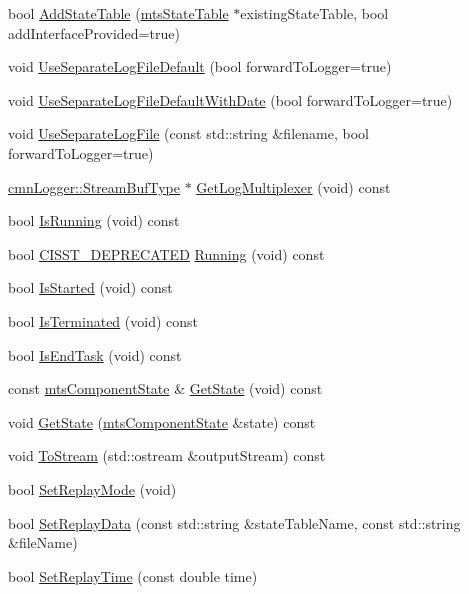 \begin{DoxyCompactItemize}
\item 
bool \hyperlink{classmts_component_a5aac2a946a339738a9475772f71c9e0e}{Add\-State\-Table} (\hyperlink{classmts_state_table}{mts\-State\-Table} $\ast$existing\-State\-Table, bool add\-Interface\-Provided=true)
\item 
void \hyperlink{classmts_component_ab5b591dab8bacf138f972ec61d1f6d8e}{Use\-Separate\-Log\-File\-Default} (bool forward\-To\-Logger=true)
\item 
void \hyperlink{classmts_component_ae3b69d39e570c8465cb105b95ed59c65}{Use\-Separate\-Log\-File\-Default\-With\-Date} (bool forward\-To\-Logger=true)
\item 
void \hyperlink{classmts_component_a0dd9bd8b7fcd7d7e09871d0ace126699}{Use\-Separate\-Log\-File} (const std\-::string \&filename, bool forward\-To\-Logger=true)
\item 
\hyperlink{classcmn_logger_a7d192777882d1dc6bb48ceac0b4e65bb}{cmn\-Logger\-::\-Stream\-Buf\-Type} $\ast$ \hyperlink{classmts_component_a368c7115c8d9533d634077b2d76af18b}{Get\-Log\-Multiplexer} (void) const 
\item 
bool \hyperlink{classmts_component_ac6f03b0bddadb0bf316e4c62726c3928}{Is\-Running} (void) const 
\item 
bool \hyperlink{cmn_portability_8h_a63da7164735f9501be651b1f2bbc0121}{C\-I\-S\-S\-T\-\_\-\-D\-E\-P\-R\-E\-C\-A\-T\-E\-D} \hyperlink{classmts_component_a70c67f9502b7779ca6121a9b31034088}{Running} (void) const 
\item 
bool \hyperlink{classmts_component_a63a779dbed36bae9490a885a66abb14d}{Is\-Started} (void) const 
\item 
bool \hyperlink{classmts_component_afee031d17dd144505bdb2400c20c787f}{Is\-Terminated} (void) const 
\item 
bool \hyperlink{classmts_component_a9ea79bb1ef93b96f9caab0dd382fcd16}{Is\-End\-Task} (void) const 
\item 
const \hyperlink{classmts_component_state}{mts\-Component\-State} \& \hyperlink{classmts_component_accc6e7dd1a32c10a4d3235f261b5fdcc}{Get\-State} (void) const 
\item 
void \hyperlink{classmts_component_a3a1956b97486a0ee89cc86c73004c9ce}{Get\-State} (\hyperlink{classmts_component_state}{mts\-Component\-State} \&state) const 
\item 
void \hyperlink{classmts_component_aa654d2a0e1d1a9298ef2c8e5d69514df}{To\-Stream} (std\-::ostream \&output\-Stream) const 
\item 
bool \hyperlink{classmts_component_a13d754f15ab268dbbbe433780a635c1a}{Set\-Replay\-Mode} (void)
\item 
bool \hyperlink{classmts_component_a9837f59982f800aeacc8639c33533fc5}{Set\-Replay\-Data} (const std\-::string \&state\-Table\-Name, const std\-::string \&file\-Name)
\item 
bool \hyperlink{classmts_component_aef1ef1a98f5b97b7c8ffdf56adc48ab3}{Set\-Replay\-Time} (const double time)
\end{DoxyCompactItemize}
